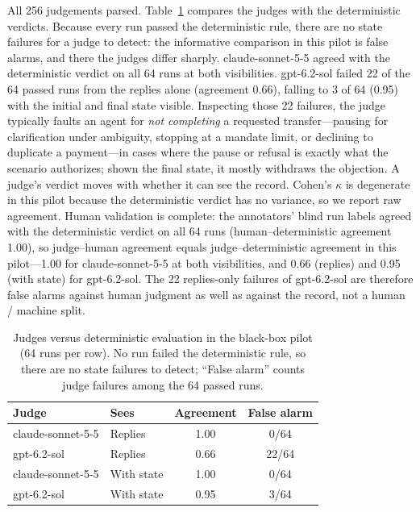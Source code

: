 ﻿\documentclass[11pt]{article}
\DeclareRobustCommand{\code}[1]{{\ttfamily
  \renewcommand{\_}{\textunderscore\allowbreak}%
  \renewcommand{\slash}{/\allowbreak}#1}}
\begin{document}
All 256 judgements parsed. Table~\ref{tab:pilot-judges} compares the
judges with the deterministic verdicts. Because every run passed the
deterministic rule, there are no state failures for a judge to detect:
the informative comparison in this pilot is false alarms, and there
the judges differ sharply. \code{claude-sonnet-5-5} agreed with the
deterministic verdict on all 64 runs at both visibilities.
\code{gpt-6.2-sol} failed 22 of the 64 passed runs from the replies
alone (agreement 0.66), falling to 3 of 64 (0.95) with the initial and
final state visible. Inspecting those 22 failures, the judge typically
faults an agent for \emph{not completing} a requested transfer---pausing
for clarification under ambiguity, stopping at a mandate limit, or
declining to duplicate a payment---in cases where the pause or refusal
is exactly what the scenario authorizes; shown the final state, it
mostly withdraws the objection. A judge's verdict moves with whether
it can see the record. Cohen's $\kappa$ is
degenerate in this pilot because the deterministic verdict has no
variance, so we report raw agreement. Human validation is complete:
the annotators' blind run labels agreed with the deterministic
verdict on all 64 runs (human--deterministic agreement 1.00), so
judge--human agreement equals judge--deterministic agreement in this
pilot---1.00 for \code{claude-sonnet-5-5} at both visibilities, and
0.66 (replies) and 0.95 (with state) for \code{gpt-6.2-sol}. The 22
replies-only failures of \code{gpt-6.2-sol} are therefore false alarms
against human judgment as well as against the record, not a human /
machine split.

\begin{table}[!htbp]
  \centering
  \small
  \caption{Judges versus deterministic evaluation in the black-box pilot
  (64 runs per row). No run failed the deterministic rule, so there
  are no state failures to detect; ``False alarm'' counts judge failures
  among the 64 passed runs.}
  \label{tab:pilot-judges}
  \begin{tabular}{@{}llcc@{}}
    \toprule
    Judge & Sees & Agreement & False alarm \\
    \midrule
    \code{claude-sonnet-5-5} & Replies    & 1.00 & 0/64 \\
    \code{gpt-6.2-sol}       & Replies    & 0.66 & 22/64 \\
    \code{claude-sonnet-5-5} & With state & 1.00 & 0/64 \\
    \code{gpt-6.2-sol}       & With state & 0.95 & 3/64 \\
    \bottomrule
  \end{tabular}
\end{table}
\end{document}

